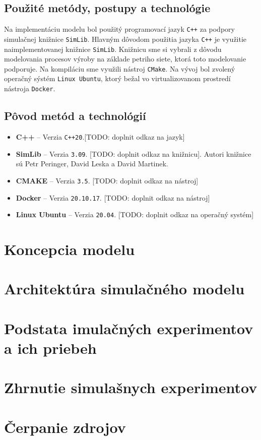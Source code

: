\documentclass[a4paper, 10pt]{article}
\begin{document}
        \subsection{Použité metódy, postupy a technológie}
        Na implementáciu modelu bol použitý programovací jazyk \texttt{C++} za podpory simulačnej knižnice \texttt{SimLib}.
        Hlavným dôvodom použitia jazyka \texttt{C++} je využitie naimplementovanej
        knižnice \texttt{SimLib}. Knižnicu sme si vybrali z dôvodu modelovania procesov výroby na základe petriho siete, ktorá
        toto modelovanie podporuje. Na kompiláciu sme využili nástroj \texttt{CMake}. Na vývoj bol zvolený operačný sýstém
        \texttt{Linux Ubuntu}, ktorý bežal vo virtualizovanom prostredí nástroja \texttt{Docker}.

        \subsection{Pôvod metód a technológií}
    \begin{itemize}
        \item \textbf{C++} -- Verzia \texttt{C++20}.[TODO: doplnit odkaz na jazyk]
        \item \textbf{SimLib} -- Verzia \texttt{3.09}. [TODO: doplnit odkaz na knižnicu]. Autori knižnice sú Petr Peringer,
        David Leska a David Martinek.
        \item \textbf{CMAKE} -- Verzia \texttt{3.5}. [TODO: doplnit odkaz na nástroj]
        \item \textbf{Docker} -- Verzia \texttt{20.10.17}. [TODO: doplnit odkaz na nástroj]
        \item \textbf{Linux Ubuntu} -- Verzia \texttt{20.04}. [TODO: doplnit odkaz na operačný systém]
    \end{itemize}

    \section {Koncepcia modelu}


    \section{Architektúra simulačného modelu}

    \section{Podstata imulačných experimentov a ich priebeh}

    \section{Zhrnutie simulašnych experimentov}

    \section {Čerpanie zdrojov}
        {\cite{example}}

    \newpage
    
    
\end{document}
